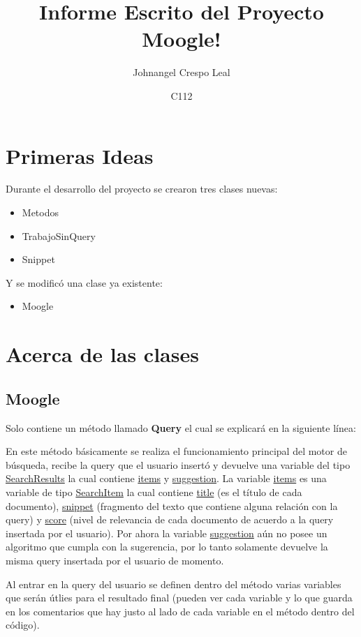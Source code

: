 \documentclass[a4paper,12pt]{article}
\begin{document}
\title{Informe Escrito del Proyecto Moogle!}
\author{Johnangel Crespo Leal}
\date{C112}
\maketitle

\section{Primeras Ideas}\label{sec:ideas}

Durante el desarrollo del proyecto se crearon tres clases nuevas:
\begin{itemize}
    \item Metodos
    \item TrabajoSinQuery
    \item Snippet
\end{itemize}

Y se modificó una clase ya existente:
\begin{itemize}
    \item Moogle
\end{itemize}

\section{Acerca de las clases}\label{sec:classes}
\subsection{Moogle}\label{sub:moogle}

Solo contiene un método llamado \textbf{Query} el cual se explicará en la siguiente línea:

En este método básicamente se realiza el funcionamiento principal del motor de búsqueda, recibe la query que el usuario insertó y 
devuelve una variable del tipo \underline{SearchResults} la cual contiene \underline{items} y \underline{suggestion}. La variable 
\underline{items} es una variable de tipo \underline{SearchItem} la cual contiene \underline{title} (es el título de cada documento), 
\underline{snippet} (fragmento del texto que contiene alguna relación con la query) y \underline{score} (nivel de relevancia de cada
documento de acuerdo a la query insertada por el usuario). Por ahora la variable \underline{suggestion} aún no posee un algoritmo 
que cumpla con la sugerencia, por lo tanto solamente devuelve la misma query insertada por el usuario de momento.

Al entrar en la query del usuario se definen dentro del método varias variables que serán útlies para el resultado final (pueden ver cada 
variable y lo que guarda en los comentarios que hay justo al lado de cada variable en el método dentro del código).
\end{document}
